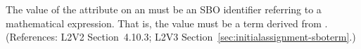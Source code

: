 The value of the  attribute on an \InitialAssignment must be an
SBO identifier referring to a mathematical expression.  That is, the value
must be a term derived from \sbomathformula.  (References: L2V2 Section~4.10.3;
L2V3 Section~\ref{sec:initialassignment-sboterm}.)
